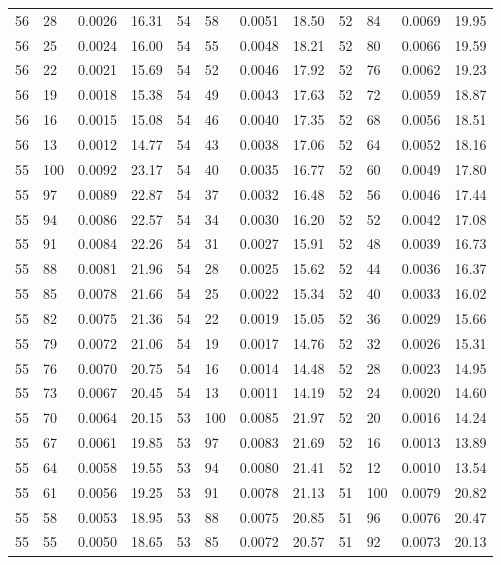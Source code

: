 \begin{tabular}{llll|llll|llll}
56 & 28 & 0.0026 & 16.31 & 54 & 58 & 0.0051 & 18.50 & 52 & 84 & 0.0069 & 19.95\\
56 & 25 & 0.0024 & 16.00 & 54 & 55 & 0.0048 & 18.21 & 52 & 80 & 0.0066 & 19.59\\
56 & 22 & 0.0021 & 15.69 & 54 & 52 & 0.0046 & 17.92 & 52 & 76 & 0.0062 & 19.23\\
56 & 19 & 0.0018 & 15.38 & 54 & 49 & 0.0043 & 17.63 & 52 & 72 & 0.0059 & 18.87\\
56 & 16 & 0.0015 & 15.08 & 54 & 46 & 0.0040 & 17.35 & 52 & 68 & 0.0056 & 18.51\\
56 & 13 & 0.0012 & 14.77 & 54 & 43 & 0.0038 & 17.06 & 52 & 64 & 0.0052 & 18.16\\
55 & 100 & 0.0092 & 23.17 & 54 & 40 & 0.0035 & 16.77 & 52 & 60 & 0.0049 & 17.80\\
55 & 97 & 0.0089 & 22.87 & 54 & 37 & 0.0032 & 16.48 & 52 & 56 & 0.0046 & 17.44\\
55 & 94 & 0.0086 & 22.57 & 54 & 34 & 0.0030 & 16.20 & 52 & 52 & 0.0042 & 17.08\\
55 & 91 & 0.0084 & 22.26 & 54 & 31 & 0.0027 & 15.91 & 52 & 48 & 0.0039 & 16.73\\
55 & 88 & 0.0081 & 21.96 & 54 & 28 & 0.0025 & 15.62 & 52 & 44 & 0.0036 & 16.37\\
55 & 85 & 0.0078 & 21.66 & 54 & 25 & 0.0022 & 15.34 & 52 & 40 & 0.0033 & 16.02\\
55 & 82 & 0.0075 & 21.36 & 54 & 22 & 0.0019 & 15.05 & 52 & 36 & 0.0029 & 15.66\\
55 & 79 & 0.0072 & 21.06 & 54 & 19 & 0.0017 & 14.76 & 52 & 32 & 0.0026 & 15.31\\
55 & 76 & 0.0070 & 20.75 & 54 & 16 & 0.0014 & 14.48 & 52 & 28 & 0.0023 & 14.95\\
55 & 73 & 0.0067 & 20.45 & 54 & 13 & 0.0011 & 14.19 & 52 & 24 & 0.0020 & 14.60\\
55 & 70 & 0.0064 & 20.15 & 53 & 100 & 0.0085 & 21.97 & 52 & 20 & 0.0016 & 14.24\\
55 & 67 & 0.0061 & 19.85 & 53 & 97 & 0.0083 & 21.69 & 52 & 16 & 0.0013 & 13.89\\
55 & 64 & 0.0058 & 19.55 & 53 & 94 & 0.0080 & 21.41 & 52 & 12 & 0.0010 & 13.54\\
55 & 61 & 0.0056 & 19.25 & 53 & 91 & 0.0078 & 21.13 & 51 & 100 & 0.0079 & 20.82\\
55 & 58 & 0.0053 & 18.95 & 53 & 88 & 0.0075 & 20.85 & 51 & 96 & 0.0076 & 20.47\\
55 & 55 & 0.0050 & 18.65 & 53 & 85 & 0.0072 & 20.57 & 51 & 92 & 0.0073 & 20.13\\

\end{tabular}
